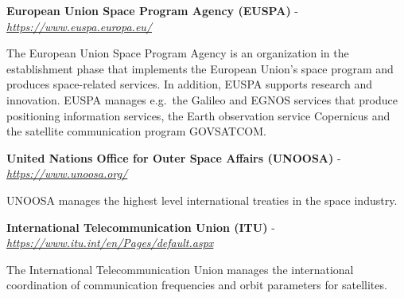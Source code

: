 \textbf{European Union Space Program Agency (EUSPA)} -
\href{https://www.euspa.europa.eu/}{\emph{https://www.euspa.europa.eu/}}

The European Union Space Program Agency is an organization in the
establishment phase that implements the European Union's space program
and produces space-related services. In addition, EUSPA supports
research and innovation. EUSPA manages e.g.~the Galileo and EGNOS
services that produce positioning information services, the Earth
observation service Copernicus and the satellite communication program
GOVSATCOM.

\textbf{United Nations Office for Outer Space Affairs (UNOOSA)} -
\href{https://www.unoosa.org/}{\emph{https://www.unoosa.org/}}

UNOOSA manages the highest level international treaties in the space
industry.

\textbf{International Telecommunication Union (ITU)} -
\href{https://www.itu.int/en/Pages/default.aspx}{\emph{https://www.itu.int/en/Pages/default.aspx}}

The International Telecommunication Union manages the international
coordination of communication frequencies and orbit parameters for
satellites.
